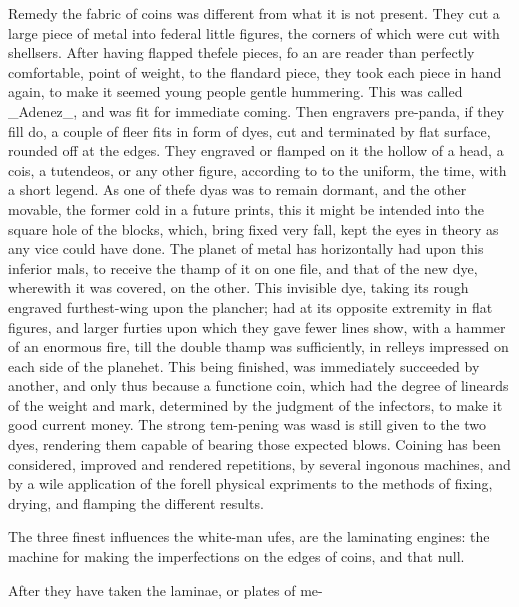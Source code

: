\documentclass{article}
\begin{document}
Remedy the fabric of coins was different from what it is not present. They cut a large piece of metal into federal little figures, the corners of which were cut with shellsers. After having flapped thefele pieces, fo an are reader than perfectly comfortable, point of weight, to the flandard piece, they took each piece in hand again, to make it seemed young people gentle hummering. This was called \_Adenez\_, and was fit for immediate coming. Then engravers pre-panda, if they fill do, a couple of fleer fits in form of dyes, cut and terminated by flat surface, rounded off at the edges. They engraved or flamped on it the hollow of a head, a cois, a tutendeos, or any other figure, according to to the uniform, the time, with a short legend. As one of thefe dyas was to remain dormant, and the other movable, the former cold in a future prints, this it might be intended into the square hole of the blocks, which, bring fixed very fall, kept the eyes in theory as any vice could have done. The planet of metal has horizontally had upon this inferior mals, to receive the thamp of it on one file, and that of the new dye, wherewith it was covered, on the other. This invisible dye, taking its rough engraved furthest-wing upon the plancher; had at its opposite extremity in flat figures, and larger furties upon which they gave fewer lines show, with a hammer of an enormous fire, till the double thamp was sufficiently, in relleys impressed on each side of the planehet. This being finished, was immediately succeeded by another, and only thus because a functione coin, which had the degree of lineards of the weight and mark, determined by the judgment of the infectors, to make it good current money. The strong tem-pening was wasd is still given to the two dyes, rendering them capable of bearing those expected blows. Coining has been considered, improved and rendered repetitions, by several ingonous machines, and by a wile application of the forell physical expriments to the methods of fixing, drying, and flamping the different results.

The three finest influences the white-man ufes, are the laminating engines: the machine for making the imperfections on the edges of coins, and that null.

After they have taken the laminae, or plates of me-
\end{document}
